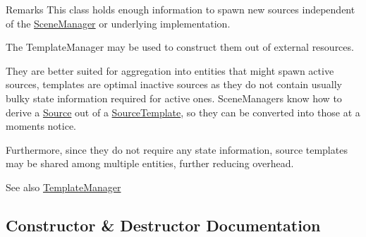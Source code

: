 \begin{DoxyRemark}{Remarks}
This class holds enough information to spawn new sources independent of the \hyperlink{classAudio_1_1SceneManager}{Scene\+Manager} or underlying implementation. 
\end{DoxyRemark}
\begin{DoxyParagraph}{The Template\+Manager may be used to construct them out of external}
resources. 
\end{DoxyParagraph}
\begin{DoxyParagraph}{They are better suited for aggregation into entities that might}
spawn active sources, templates are optimal inactive sources as they do not contain usually bulky state information required for active ones. Scene\+Managers know how to derive a \hyperlink{classAudio_1_1Source}{Source} out of a \hyperlink{classAudio_1_1SourceTemplate}{Source\+Template}, so they can be converted into those at a moment\textquotesingle{}s notice. 
\end{DoxyParagraph}
\begin{DoxyParagraph}{Furthermore, since they do not require any state information, source templates}
may be shared among multiple entities, further reducing overhead. 
\end{DoxyParagraph}
\begin{DoxySeeAlso}{See also}
\hyperlink{classAudio_1_1TemplateManager}{Template\+Manager} 
\end{DoxySeeAlso}


\subsection{Constructor \& Destructor Documentation}
